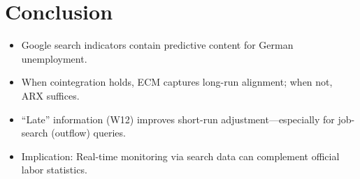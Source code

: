 \documentclass{article}
\begin{document}
\section{Conclusion}
\begin{itemize}
  \item Google search indicators contain predictive content for German unemployment.
  \item When cointegration holds, ECM captures long-run alignment; when not, ARX suffices.
  \item “Late” information (W12) improves short-run adjustment—especially for job-search (outflow) queries.
  \item Implication: Real-time monitoring via search data can complement official labor statistics.
\end{itemize}
\end{document}

